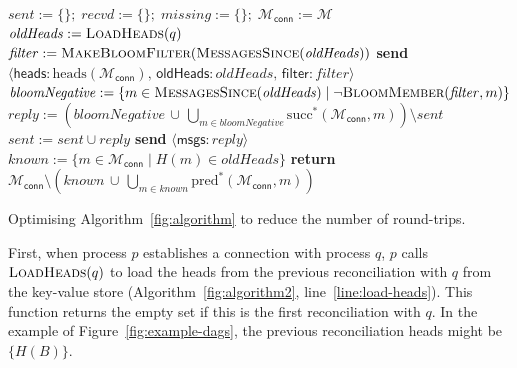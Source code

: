 \documentclass[a4paper,anonymous,USenglish]{lipics-v2019}
\begin{document}
\begin{algorithm}[t]
    \begin{algorithmic}[1]
        \State $\mathit{sent} := \{\};\; \mathit{recvd} := \{\};\; \mathit{missing} := \{\};\; \mathcal{M}_\mathsf{conn} := \mathcal{M}$ 
        \State $\mathit{oldHeads} := \Call{LoadHeads}{q}$\label{line:load-heads}
        \State $\mathit{filter} := \textsc{MakeBloomFilter}(\Call{MessagesSince}{\mathit{oldHeads}})$\label{line:make-bloom}
        \State \textbf{send} $\langle\mathsf{heads}: \mathrm{heads}(\mathcal{M}_\mathsf{conn}),\, \mathsf{oldHeads}: \mathit{oldHeads},\, \mathsf{filter}: \mathit{filter}\rangle$ \label{line:a2-send-heads}
    \EndOn
    \State
    \label{line:a2-recv-heads}
        \State $\mathit{bloomNegative} := \{m \in \Call{MessagesSince}{\mathit{oldHeads}} \mid \neg\Call{BloomMember}{\mathit{filter}, m}\}$\label{line:bloom-member}
        \State $\mathit{reply} := \left(\mathit{bloomNegative} \,\cup\, \bigcup_{m \in \mathit{bloomNegative}} \mathrm{succ}^*(\mathcal{M}_\mathsf{conn}, m)\right) \setminus \mathit{sent}$\label{line:bloom-succ}
            \State $\mathit{sent} := \mathit{sent} \cup \mathit{reply}$
            \State \textbf{send} $\langle\mathsf{msgs}: \mathit{reply}\rangle$ \label{line:a2-heads-reply}
        \EndIf
        \State {} \label{line:a2-heads-missing}
    \EndOn
    \State
    \label{line:msg-since-begin}
        \State $\mathit{known} := \{m \in \mathcal{M}_\mathsf{conn} \mid H(m) \in \mathit{oldHeads}\}$
        \State \textbf{return} $\mathcal{M}_\mathsf{conn} \setminus \left(\mathit{known} \,\cup\, \bigcup_{m \in \mathit{known}} \mathrm{pred}^*(\mathcal{M}_\mathsf{conn}, m)\right)$
    \EndFunction\label{line:msg-since-end}
    \end{algorithmic}
    \caption{Optimising Algorithm~\ref{fig:algorithm} to reduce the number of round-trips.}\label{fig:algorithm2}
\end{algorithm}

First, when process $p$ establishes a connection with process $q$, $p$ calls $\textsc{LoadHeads}(q)$ to load the heads from the previous reconciliation with $q$ from the key-value store (Algorithm~\ref{fig:algorithm2}, line~\ref{line:load-heads}).
This function returns the empty set if this is the first reconciliation with $q$.
In the example of Figure~\ref{fig:example-dags}, the previous reconciliation heads might be $\{H(B)\}$.
\end{document}
